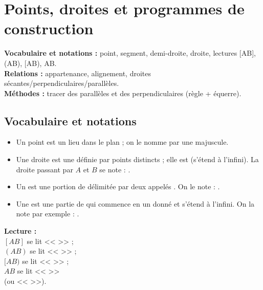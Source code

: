 \chapter{Points, droites et programmes de construction}
\label{chap:seq02}

\newcommand{\trou}[1]{\makebox[#1]{\dotfill}}

\begin{objectifsbox}
	\textbf{Vocabulaire et notations :} point, segment, demi-droite, droite, lectures [AB], (AB), [AB), AB.\\
	\textbf{Relations :} appartenance, alignement, droites sécantes/perpendiculaires/parallèles.\\
	\textbf{Méthodes :} tracer des parallèles et des perpendiculaires (règle + équerre).
\end{objectifsbox}

\section{ Vocabulaire et notations}
\begin{itemize}
	\item Un point est un lieu dans le plan ; on le nomme par une \trou{5cm} majuscule.
	\item Une droite est une \trou{3cm} définie par \trou{3cm} points distincts ; elle est \trou{3cm} (s'étend à l'infini).
	La droite passant par $A$ et $B$ se note : \trou{3.8cm}.
	\item Un \trou{2.2cm} est une portion de \trou{2.2cm} délimitée par deux \trou{2.2cm} appelés \trou{2.2cm}.
	On le note : \trou{3cm}.
	\item Une \trou{2.2cm} est une partie de \trou{2.2cm} qui commence en un \trou{2.5cm} donné et s'étend à l'infini.
	On la note par exemple : \trou{2.8cm}.
\end{itemize}

\textbf{Lecture :} \\
$[AB]$ se lit << \trou{9.5cm} >> ;\\
$(AB)$ se lit << \trou{9.5cm} >> ;\\
$[AB)$ se lit << \trou{9.5cm} >> ;\\
$AB$ se lit << \trou{9.5cm} >>\\
(ou << \trou{9.5cm} >>).

